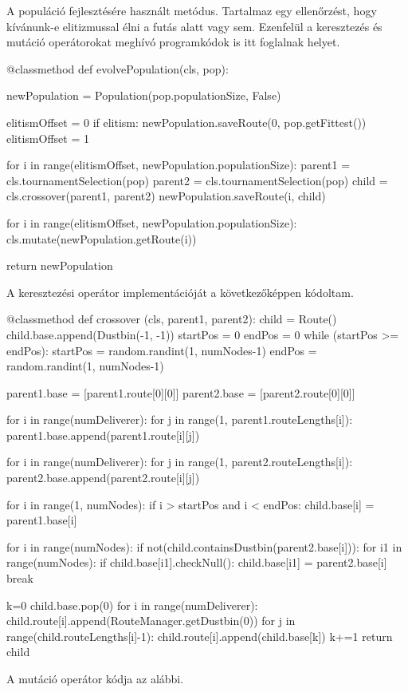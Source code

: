 A populáció fejlesztésére használt metódus. Tartalmaz egy ellenőrzést, hogy kívánunk-e elitizmussal élni a futás alatt vagy sem. Ezenfelül a keresztezés és mutáció operátorokat meghívó programkódok is itt foglalnak helyet.

\begin{python}
@classmethod
def evolvePopulation(cls, pop):

    newPopulation = Population(pop.populationSize, False)

    elitismOffset = 0
    if elitism:
        newPopulation.saveRoute(0, pop.getFittest())
        elitismOffset = 1

    for i in range(elitismOffset, newPopulation.populationSize):
        parent1 = cls.tournamentSelection(pop)
        parent2 = cls.tournamentSelection(pop)
        child = cls.crossover(parent1, parent2)
        newPopulation.saveRoute(i, child)

    for i in range(elitismOffset, newPopulation.populationSize):
        cls.mutate(newPopulation.getRoute(i))

    return newPopulation
\end{python}
A keresztezési operátor implementációját a következőképpen kódoltam.

\begin{python}
@classmethod
def crossover (cls, parent1, parent2):
    child = Route()
    child.base.append(Dustbin(-1, -1))
    startPos = 0
    endPos = 0
    while (startPos >= endPos):
        startPos = random.randint(1, numNodes-1)
        endPos = random.randint(1, numNodes-1)

    parent1.base = [parent1.route[0][0]]
    parent2.base = [parent2.route[0][0]]

    for i in range(numDeliverer):
        for j in range(1, parent1.routeLengths[i]):
            parent1.base.append(parent1.route[i][j])

    for i in range(numDeliverer):
        for j in range(1, parent2.routeLengths[i]):
            parent2.base.append(parent2.route[i][j])

    for i in range(1, numNodes):
        if i > startPos and i < endPos:
            child.base[i] = parent1.base[i]

    for i in range(numNodes):
        if not(child.containsDustbin(parent2.base[i])):
            for i1 in range(numNodes):
                if child.base[i1].checkNull():
                    child.base[i1] =  parent2.base[i]
                    break

    k=0
    child.base.pop(0)
    for i in range(numDeliverer):
        child.route[i].append(RouteManager.getDustbin(0))
        for j in range(child.routeLengths[i]-1):
            child.route[i].append(child.base[k])
            k+=1
    return child
\end{python}
A mutáció operátor kódja az alábbi.

